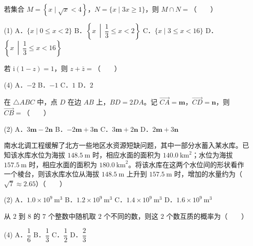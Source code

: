 \begin{question}
若集合 $M=\left\{x\mid\sqrt x<4\right\}$，$N=\{x\mid3x\ge1\}$，则 $M\cap N=$（　　）

\begin{gkopts}(1)
\task A．$\{x\mid0\le x<2\}$
\task B．$\left\{x\ \middle|\ \dfrac13\le x<2\right\}$
\task C．$\{x\mid3\le x<16\}$
\task D．$\left\{x\ \middle|\ \dfrac13\le x<16\right\}$
\end{gkopts}

\end{question}
\begin{question}
若 $\mathrm i(1-z)=1$，则 $z+\bar z=$（　　）

\begin{gkopts}(4)
\task A．$-2$
\task B．$-1$
\task C．$1$
\task D．$2$
\end{gkopts}

\end{question}
\begin{question}
在 $\triangle ABC$ 中，点 $D$ 在边 $AB$ 上，$BD=2DA$。记 $\overrightarrow{CA}=\boldsymbol m$，$\overrightarrow{CD}=\boldsymbol n$，则 $\overrightarrow{CB}=$（　　）

\begin{gkopts}(2)
\task A．$3\boldsymbol m-2\boldsymbol n$
\task B．$-2\boldsymbol m+3\boldsymbol n$
\task C．$3\boldsymbol m+2\boldsymbol n$
\task D．$2\boldsymbol m+3\boldsymbol n$
\end{gkopts}

\end{question}
\begin{question}
南水北调工程缓解了北方一些地区水资源短缺问题，其中一部分水蓄入某水库。已知该水库水位为海拔 $148.5\ \mathrm m$ 时，相应水面的面积为 $140.0\ \mathrm{km}^{2}$；水位为海拔 $157.5\ \mathrm m$ 时，相应水面的面积为 $180.0\ \mathrm{km}^{2}$。将该水库在这两个水位间的形状看作一个棱台，则该水库水位从海拔 $148.5\ \mathrm m$ 上升到 $157.5\ \mathrm m$ 时，增加的水量约为（$\sqrt7\approx2.65$）（　　）

\begin{gkopts}(2)
\task A．$1.0\times10^{9}\ \mathrm m^{3}$
\task B．$1.2\times10^{9}\ \mathrm m^{3}$
\task C．$1.4\times10^{9}\ \mathrm m^{3}$
\task D．$1.6\times10^{9}\ \mathrm m^{3}$
\end{gkopts}

\end{question}
\begin{question}
从 $2$ 到 $8$ 的 $7$ 个整数中随机取 $2$ 个不同的数，则这 $2$ 个数互质的概率为（　　）

\begin{gkopts}(4)
\task A．$\dfrac16$
\task B．$\dfrac13$
\task C．$\dfrac12$
\task D．$\dfrac23$
\end{gkopts}

\end{question}

